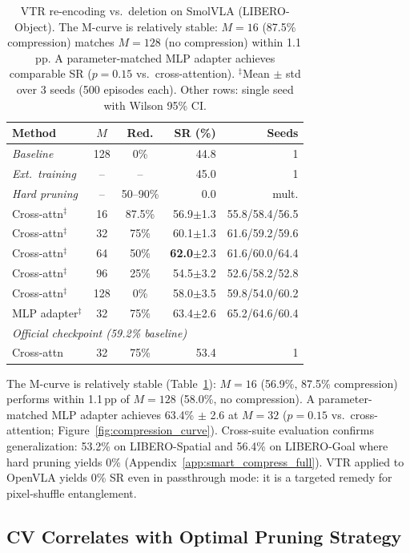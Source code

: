 \begin{table}[t]
\centering
\small
\caption{VTR re-encoding vs.\ deletion on SmolVLA (LIBERO-Object). The M-curve is relatively stable: $M{=}16$ (87.5\% compression) matches $M{=}128$ (no compression) within 1.1\,pp. A parameter-matched MLP adapter achieves comparable SR ($p = 0.15$ vs.\ cross-attention). $^\ddagger$Mean $\pm$ std over 3 seeds (500 episodes each). Other rows: single seed with Wilson 95\% CI.}
\label{tab:smart_compress}
\begin{tabular}{lccrr}
\toprule
Method & $M$ & Red. & SR (\%) & Seeds \\
\midrule
\textit{Baseline} & 128 & 0\% & 44.8 & 1 \\
\textit{Ext.\ training} & -- & -- & 45.0 & 1 \\
\textit{Hard pruning} & -- & 50--90\% & 0.0 & mult. \\
\midrule
Cross-attn$^\ddagger$ & 16 & 87.5\% & 56.9$\pm$1.3 & 55.8/58.4/56.5 \\
Cross-attn$^\ddagger$ & 32 & 75\% & 60.1$\pm$1.3 & 61.6/59.2/59.6 \\
Cross-attn$^\ddagger$ & 64 & 50\% & \textbf{62.0}$\pm$2.3 & 61.6/60.0/64.4 \\
Cross-attn$^\ddagger$ & 96 & 25\% & 54.5$\pm$3.2 & 52.6/58.2/52.8 \\
Cross-attn$^\ddagger$ & 128 & 0\% & 58.0$\pm$3.5 & 59.8/54.0/60.2 \\
MLP adapter$^\ddagger$ & 32 & 75\% & 63.4$\pm$2.6 & 65.2/64.6/60.4 \\
\midrule
\multicolumn{5}{l}{\textit{Official checkpoint (59.2\% baseline)}} \\
Cross-attn & 32 & 75\% & 53.4 & 1 \\
\bottomrule
\end{tabular}
\end{table}

The M-curve is relatively stable (Table~\ref{tab:smart_compress}): $M{=}16$ (56.9\%, 87.5\% compression) performs within 1.1\,pp of $M{=}128$ (58.0\%, no compression). A parameter-matched MLP adapter achieves 63.4\% $\pm$ 2.6 at $M{=}32$ ($p = 0.15$ vs.\ cross-attention; Figure~\ref{fig:compression_curve}). Cross-suite evaluation confirms generalization: 53.2\% on LIBERO-Spatial and 56.4\% on LIBERO-Goal where hard pruning yields 0\% (Appendix~\ref{app:smart_compress_full}). VTR applied to OpenVLA yields 0\% SR even in passthrough mode: it is a targeted remedy for pixel-shuffle entanglement.

\subsection{CV Correlates with Optimal Pruning Strategy}
\label{sec:scaling_law}

